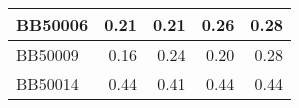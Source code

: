 \begin{table}[!htbp]
\begin{tabular}{|l|r|r|r|r|}
		\hline
		BB50006 & \cellcolor[rgb]{ .384,  .745,  .478}0.21 & \cellcolor[rgb]{ .384,  .745,  .478}0.21 & \cellcolor[rgb]{ .835,  .933,  .863}0.26 & \cellcolor[rgb]{ .988,  1,  .992}0.28 \\
		\hline
		BB50009 & \cellcolor[rgb]{ .384,  .745,  .478}0.16 & \cellcolor[rgb]{ .784,  .914,  .82}0.24 & \cellcolor[rgb]{ .584,  .827,  .647}0.20 & \cellcolor[rgb]{ .988,  1,  .992}0.28 \\
		\hline
		BB50014 & \cellcolor[rgb]{ .988,  1,  .992}0.44 & \cellcolor[rgb]{ .384,  .745,  .478}0.41 & \cellcolor[rgb]{ .988,  1,  .992}0.44 & \cellcolor[rgb]{ .988,  1,  .992}0.44 \\
		\hline
	\end{tabular}%
	\label{tab:pasta-variants-b}%
\end{table}%

